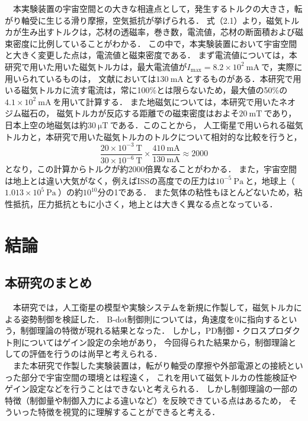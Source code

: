 　本実験装置の宇宙空間との大きな相違点として，発生するトルクの大きさ，転がり軸受に生じる滑り摩擦，空気抵抗が挙げられる．
式（2.1）より，磁気トルカが生み出すトルクは，芯材の透磁率，巻き数，電流値，芯材の断面積および磁束密度に比例していることがわかる．
この中で，本実験装置において宇宙空間と大きく変更した点は，電流値と磁束密度である．
まず電流値については，本研究で用いた用いた磁気トルカは，最大電流値が$I_\mathrm{max}=8.2\times10^2~\mathrm{mA}~$で，実際に用いられているものは，
文献\cite{torquer}においては$130~\mathrm{mA}~$とするものがある．本研究で用いる磁気トルカに流す電流は，常に100\%とは限らないため，最大値の50\%の$4.1\times10^2~\mathrm{mA}~$を用いて計算する．
また地磁気については，本研究で用いたネオジム磁石の，
磁気トルカが反応する距離での磁束密度はおよそ$20~\mathrm{mT}~$であり，日本上空の地磁気は約$30~\mathrm{\mu T}~$である\cite{chijiki}．このことから，
人工衛星で用いられる磁気トルカと，本研究で用いた磁気トルカのトルクについて相対的な比較を行うと，
\begin{equation}
	\frac{20\times10^{-3}~\mathrm{T}}{30\times10^{-6}~\mathrm{T}}\times\frac{410~\mathrm{mA}}{130~\mathrm{mA}} \approx 2000
\end{equation}
となり，この計算からトルクが約2000倍異なることがわかる．
また，宇宙空間は地上とは違い大気がなく，例えばISSの高度での圧力は$10^{-5}~\mathrm{Pa}~$と，地球上（$1.013\times10^{5}~\mathrm{Pa}~$）の約$10^{10}$分の1である．
また気体の粘性もほとんどないため，粘性抵抗，圧力抵抗ともに小さく，地上とは大きく異なる点となっている．




\newpage
\section{結論}
\subsection{本研究のまとめ}
　本研究では，人工衛星の模型や実験システムを新規に作製して，磁気トルカによる姿勢制御を検証した．
B-dot制御則については，角速度を0に指向するという，制御理論の特徴が現れる結果となった．
しかし，PD制御・クロスプロダクト則についてはゲイン設定の余地があり，
今回得られた結果から，制御理論としての評価を行うのは尚早と考えられる．\\
　また本研究で作製した実験装置は，転がり軸受の摩擦や外部電源との接続といった部分で宇宙空間の環境とは程遠く，
これを用いて磁気トルカの性能検証やゲイン設定などを行うことはできないと考えられる．
しかし制御理論の一部の特徴（制御量や制御入力による違いなど）を反映できている点はあるため，
そういった特徴を視覚的に理解することができると考える．


